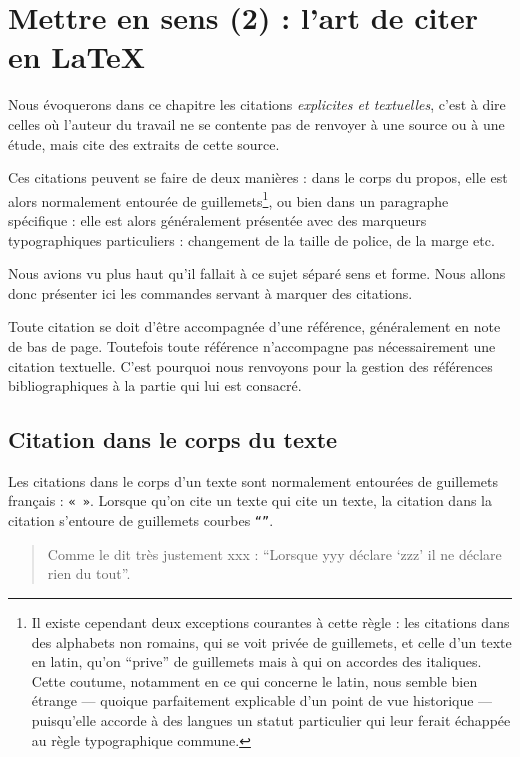 \chapter{Mettre en sens (2) : l'art de citer en LaTeX}


Nous évoquerons dans ce chapitre les citations \emph{explicites et textuelles}, c'est à dire celles où l'auteur du travail ne se contente pas de renvoyer à une source ou à une étude, mais cite des extraits de cette source.

Ces citations peuvent se faire de deux manières : dans le corps du propos, elle est alors normalement entourée de guillemets\footnote{Il existe cependant deux exceptions courantes à cette règle : les citations dans des alphabets non romains, qui se voit privée de guillemets, et celle d'un texte en latin, qu'on \enquote{prive} de guillemets mais à qui on accordes des italiques. Cette coutume, notamment en ce qui concerne le latin, nous semble bien étrange --- quoique parfaitement explicable d'un point de vue historique --- puisqu'elle accorde à des langues un statut particulier qui leur ferait échappée au règle typographique commune.}, ou bien dans un paragraphe spécifique : elle est alors généralement présentée avec des marqueurs typographiques particuliers : changement de la taille de police, de la marge etc.

Nous avions vu plus haut qu'il fallait à ce sujet séparé sens et forme. Nous allons donc présenter ici les commandes servant à marquer des citations.

\begin{attention}
Toute citation se doit d'être accompagnée d'une référence, généralement en note de bas de page. Toutefois toute référence n'accompagne pas nécessairement une citation textuelle. C'est pourquoi nous renvoyons pour la gestion des références bibliographiques à la partie qui lui est consacré.

\end{attention}

\section{Citation dans le corps du texte}

Les citations dans le corps d'un texte sont normalement entourées de guillemets français : \verb|« »|. Lorsque qu'on cite un texte qui cite un texte, la citation dans la citation s'entoure de guillemets courbes \verb|“”|. 

\begin{quotation}
	Comme le dit très justement xxx : \enquote{Lorsque yyy déclare \enquote{zzz} il ne déclare rien du tout}.
\end{quotation}

